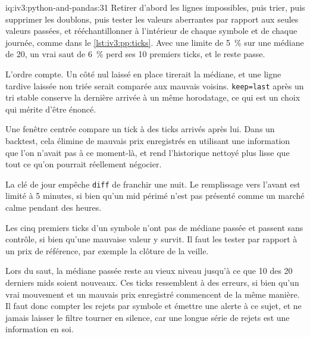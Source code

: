 \begin{solution}{iq:iv3:python-and-pandas:31}
Retirer d'abord les lignes impossibles, puis trier, puis supprimer les doublons, puis tester les valeurs aberrantes par rapport aux seules valeurs passées, et rééchantillonner à l'intérieur de chaque symbole et de chaque journée, comme dans le \cref{lst:iv3:pp:ticks}. Avec une limite de 5~\% sur une médiane de 20, un vrai saut de 6~\% perd ses 10 premiers ticks, et le reste passe.
\enlargethispage{-3\baselineskip}%
\label{lst:iv3:pp:ticks}

L'ordre compte. Un côté nul laissé en place tirerait la médiane, et une ligne tardive laissée non triée serait comparée aux mauvais voisins. \texttt{keep=\textquotesingle last\textquotesingle} après un tri stable conserve la dernière arrivée à un même horodatage, ce qui est un choix qui mérite d'être énoncé.

Une fenêtre centrée compare un tick à des ticks arrivés après lui. Dans un backtest, cela élimine de mauvais prix enregistrés en utilisant une information que l'on n'avait pas à ce moment-là, et rend l'historique nettoyé plus lisse que tout ce qu'on pourrait réellement négocier.

La clé de jour empêche \texttt{diff} de franchir une nuit. Le remplissage vers l'avant est limité à 5 minutes, si bien qu'un mid périmé n'est pas présenté comme un marché calme pendant des heures.

Les cinq premiers ticks d'un symbole n'ont pas de médiane passée et passent sans contrôle, si bien qu'une mauvaise valeur y survit. Il faut les tester par rapport à un prix de référence, par exemple la clôture de la veille.

Lors du saut, la médiane passée reste au vieux niveau jusqu'à ce que 10 des 20 derniers mids soient nouveaux. Ces ticks ressemblent à des erreurs, si bien qu'un vrai mouvement et un mauvais prix enregistré commencent de la même manière. Il faut donc compter les rejets par symbole et émettre une alerte à ce sujet, et ne jamais laisser le filtre tourner en silence, car une longue série de rejets est une information en soi.

\end{solution}

